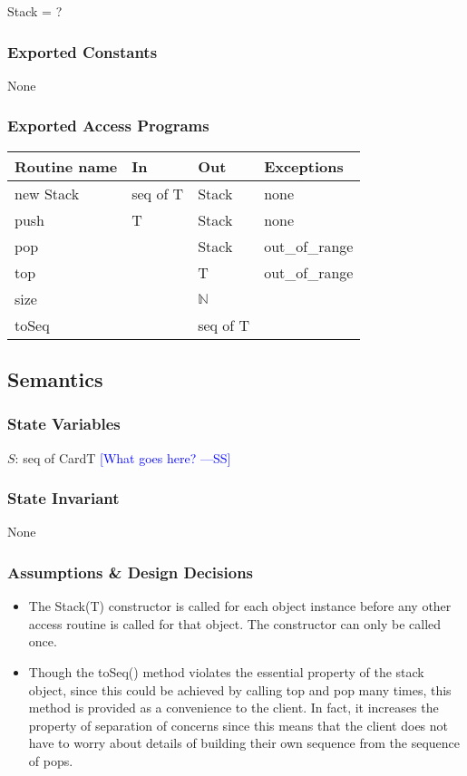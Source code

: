 \documentclass[12pt]{article}
\newcommand{\authornote}[3]{\textcolor{#1}{[#3 ---#2]}}
\newcommand{\authornote}[3]{}
\newcommand{\wss}[1]{\authornote{blue}{SS}{#1}}
\begin{document}
Stack = ?

\subsubsection* {Exported Constants}

None

\subsubsection* {Exported Access Programs}

\begin{tabular}{| l | l | l | p{5cm} |}
\hline
\textbf{Routine name} & \textbf{In} & \textbf{Out} & \textbf{Exceptions}\\
\hline
new Stack & seq of T & Stack & none\\
\hline
push & T & Stack & none\\
\hline
pop & & Stack & out\_of\_range\\
\hline
top & & T & out\_of\_range\\
\hline
size & & $\mathbb{N}$ & \\
\hline
toSeq& & seq of T & \\
\hline
\end{tabular}

\subsection* {Semantics}

\subsubsection* {State Variables}

$S$: seq of CardT  \wss{What goes here?}

\subsubsection* {State Invariant}

None

\subsubsection* {Assumptions \& Design Decisions}

\begin{itemize}
\item The Stack(T) constructor is called for each object instance before any
  other access routine is called for that object.  The constructor can only be
  called once.
\item Though the toSeq() method violates the essential property of the stack
  object, since this could be achieved by calling top and pop many times, this
  method is provided as a convenience to the client. In fact, it increases the
  property of separation of concerns since this means that the client does not
  have to worry about details of building their own sequence from the sequence
  of pops.
\end{itemize}
\end{document}
